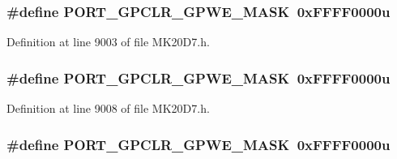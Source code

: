 \subsubsection[{\texorpdfstring{P\+O\+R\+T\+\_\+\+G\+P\+C\+L\+R\+\_\+\+G\+P\+W\+E\+\_\+\+M\+A\+SK}{PORT_GPCLR_GPWE_MASK}}]{\setlength{\rightskip}{0pt plus 5cm}\#define P\+O\+R\+T\+\_\+\+G\+P\+C\+L\+R\+\_\+\+G\+P\+W\+E\+\_\+\+M\+A\+SK~0x\+F\+F\+F\+F0000u}\hypertarget{group___p_o_r_t___register___masks_ga49c4160370859546837be80a2eed1365}{}\label{group___p_o_r_t___register___masks_ga49c4160370859546837be80a2eed1365}


Definition at line 9003 of file M\+K20\+D7.\+h.

\subsubsection[{\texorpdfstring{P\+O\+R\+T\+\_\+\+G\+P\+C\+L\+R\+\_\+\+G\+P\+W\+E\+\_\+\+M\+A\+SK}{PORT_GPCLR_GPWE_MASK}}]{\setlength{\rightskip}{0pt plus 5cm}\#define P\+O\+R\+T\+\_\+\+G\+P\+C\+L\+R\+\_\+\+G\+P\+W\+E\+\_\+\+M\+A\+SK~0x\+F\+F\+F\+F0000u}\hypertarget{group___p_o_r_t___register___masks_ga49c4160370859546837be80a2eed1365}{}\label{group___p_o_r_t___register___masks_ga49c4160370859546837be80a2eed1365}


Definition at line 9008 of file M\+K20\+D7.\+h.

\subsubsection[{\texorpdfstring{P\+O\+R\+T\+\_\+\+G\+P\+C\+L\+R\+\_\+\+G\+P\+W\+E\+\_\+\+M\+A\+SK}{PORT_GPCLR_GPWE_MASK}}]{\setlength{\rightskip}{0pt plus 5cm}\#define P\+O\+R\+T\+\_\+\+G\+P\+C\+L\+R\+\_\+\+G\+P\+W\+E\+\_\+\+M\+A\+SK~0x\+F\+F\+F\+F0000u}\hypertarget{group___p_o_r_t___register___masks_ga49c4160370859546837be80a2eed1365}{}\label{group___p_o_r_t___register___masks_ga49c4160370859546837be80a2eed1365}


